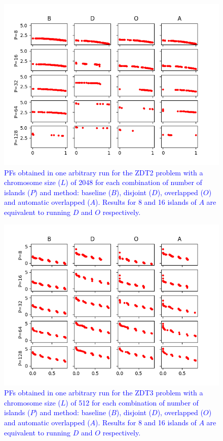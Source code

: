 \documentclass[preprint]{elsarticle}
\begin{document}
\begin{figure}
\centering
\includegraphics[width=12cm]{plot_zdt2_2048.png}
\caption{\textcolor{blue}{PFs obtained in one arbitrary run for the ZDT2 problem with a chromosome size ($L$) of 2048 for each combination of number of islands ($P$) and method: baseline ($B$), disjoint ($D$), overlapped ($O$) and automatic overlapped ($A$). Results for 8 and 16 islands of $A$ are equivalent to running $D$ and $O$ respectively. }}
\label{fig:plot_zdt2_2048}
\end{figure}





\begin{figure}
\centering
\includegraphics[width=12cm]{plot_zdt3_512.png}
\caption{\textcolor{blue}{PFs obtained in one arbitrary run for the ZDT3 problem with a chromosome size ($L$) of 512 for each combination of number of islands ($P$) and method: baseline ($B$), disjoint ($D$), overlapped ($O$) and automatic overlapped ($A$). Results for 8 and 16 islands of $A$ are equivalent to running $D$ and $O$ respectively. }}
\label{fig:plot_zdt3_512}
\end{figure}
\end{document}
